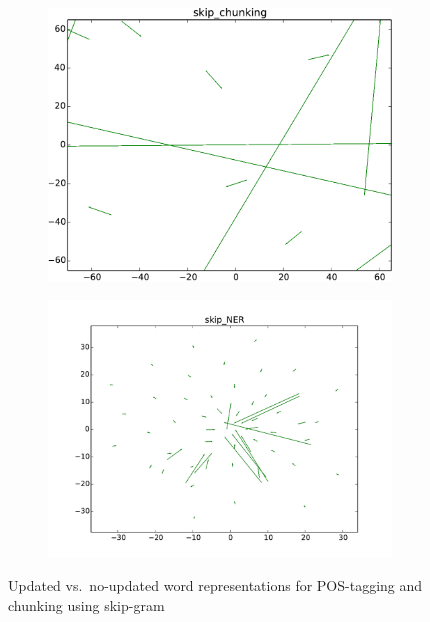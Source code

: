 \begin{figure}
\centering
\begin{subfigure}[b]{0.48\textwidth}
	\centering
    \includegraphics[width=\textwidth]{plots/vectorField/Lizhen/scaled/Lizhen_skip_chunking}
	\label{fig:skipChu}
\end{subfigure}
\begin{subfigure}[b]{0.48\textwidth}
	\centering
    \includegraphics[width=\textwidth]{plots/vectorField/Lizhen/Lizhen_skip_NER}    	
	\label{fig:skippos}	
\end{subfigure}
\caption{Updated vs.\ no-updated word representations for POS-tagging and chunking using skip-gram}
\label{fig:vectorfield}
\end{figure}

